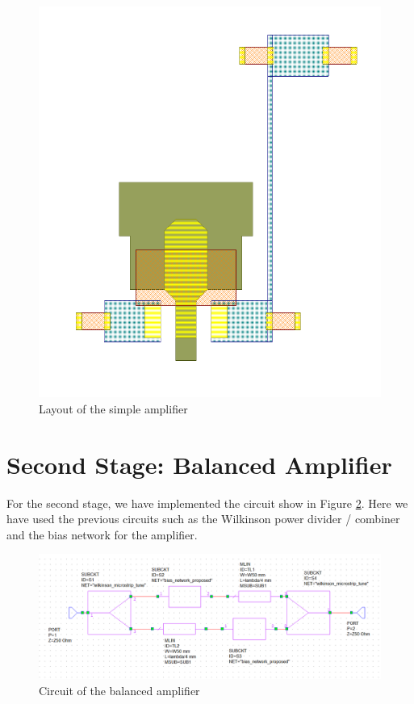 \documentclass[12pt]{report} %
\let\oldsection\section
\renewcommand\section{\clearpage\oldsection}
\begin{document}
\begin{figure}[htbp]
    \centering
    \includegraphics[width=1\linewidth]{images//microstrip_elements/simple_amplifier_microstrip_layout.png}
    \caption{Layout of the simple amplifier}
    \label{fig:microstrip_elements:simple_amplifier_microstrip_layout}
\end{figure}

\section{Second Stage: Balanced Amplifier}

For the second stage, we have implemented the circuit show in Figure \ref{fig:microstrip_elements:balanced_amplifier_microstrip_circuit}.  Here we have used the previous circuits such as the Wilkinson power divider / combiner and the bias network for the amplifier.

\begin{figure}[htbp]
    \centering
    \includegraphics[width=1\linewidth]{images//microstrip_elements/balanced_amplifier_microstrip_circuit.png}
    \caption{Circuit of the balanced amplifier}
    \label{fig:microstrip_elements:balanced_amplifier_microstrip_circuit}
\end{figure}
\end{document}
